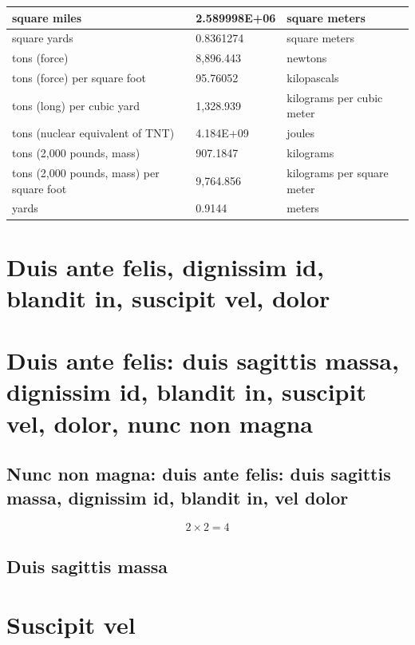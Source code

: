 \documentclass{template/openetcs_article_nocc}
\begin{document}
{\begin{longtable}{||l|l|l||}
    square miles & 2.589998E+06 & square meters\\
    \hline
    square yards & 0.8361274 & square meters\\
    \hline
    tons (force) & 8,896.443 & newtons\\
    \hline
    tons (force) per square foot & 95.76052 & kilopascals\\
    \hline
    tons (long) per cubic yard & 1,328.939 & kilograms per cubic meter\\
    \hline
    tons (nuclear equivalent of TNT) & 4.184E+09 & joules\\
    \hline
    tons (2,000 pounds, mass) & 907.1847 & kilograms\\
    \hline
    tons (2,000 pounds, mass) per square foot & 9,764.856 & kilograms per square meter\\
\hline
yards & 0.9144 & meters\\
\hline
\end{longtable}}


\section{Duis ante felis, dignissim id, blandit in, suscipit vel,
  dolor}
\section{Duis ante felis: duis sagittis massa, dignissim id, blandit
  in, suscipit vel, dolor, nunc non magna}
\subsection{Nunc non magna: duis ante felis: duis sagittis massa,
  dignissim id, blandit in, vel dolor}
\lipsum[6]

\begin{equation}
  \label{eq:eq}
  2\times2=4
\end{equation}

\subsection{Duis sagittis massa}

\lipsum[7-9]

\section{Suscipit vel}

\lipsum[23]
\end{document}
